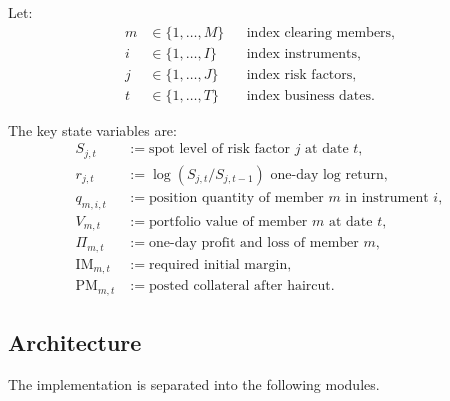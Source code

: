 \documentclass[11pt]{article}
\begin{document}
Let:
\begin{align*}
m &\in \{1,\dots,M\} && \text{index clearing members},\\
i &\in \{1,\dots,I\} && \text{index instruments},\\
j &\in \{1,\dots,J\} && \text{index risk factors},\\
t &\in \{1,\dots,T\} && \text{index business dates}.
\end{align*}

The key state variables are:
\begin{align*}
S_{j,t} &:= \text{spot level of risk factor } j \text{ at date } t,\\
r_{j,t} &:= \log(S_{j,t}/S_{j,t-1}) \text{ one-day log return},\\
q_{m,i,t} &:= \text{position quantity of member } m \text{ in instrument } i,\\
V_{m,t} &:= \text{portfolio value of member } m \text{ at date } t,\\
\Pi_{m,t} &:= \text{one-day profit and loss of member } m,\\
\text{IM}_{m,t} &:= \text{required initial margin},\\
\text{PM}_{m,t} &:= \text{posted collateral after haircut}.
\end{align*}

\subsection{Architecture}

The implementation is separated into the following modules.
\end{document}
